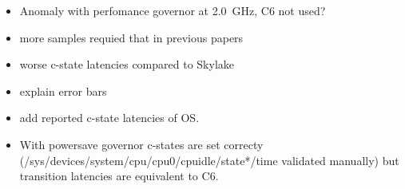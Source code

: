 \begin{itemize}
    \item Anomaly with perfomance governor at \SI{2.0}{\GHz}, C6 not used?
    \item more samples requied that in previous papers
    \item worse c-state latencies compared to Skylake
    \item explain error bars
    \item add reported c-state latencies of OS.
    \item With powersave governor c-states are set correcty (/sys/devices/system/cpu/cpu0/cpuidle/state*/time validated manually) but transition latencies are equivalent to C6.
\end{itemize}
